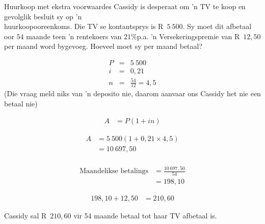\begin{wex}{Huurkoop met ekstra voorwaardes}{
    Cassidy is desperaat om 'n TV te koop en gevolglik besluit sy op 'n \\huurkoopooreenkoms. Die TV se kontantsprys is R~$5~500$. Sy moet dit afbetaal oor $54$ maande teen 'n rentekoers van $21\%$p.a. 'n Versekeringspremie van R~$12,50$ per maand word bygevoeg. Hoeveel moet sy per maand betaal?}{

    \begin{eqnarray*}
	P &=& 5~500\\
	i &=& 0,21\\
	n &=& \frac{54}{12} = 4,5
    \end{eqnarray*}
(Die vraag meld niks van 'n deposito nie, daarom aanvaar ons Cassidy het nie een betaal nie)

    \begin{align*}
	    A &= P(1 + in)
    \end{align*}

    \begin{align*}
	A &= 5~500(1 + 0,21 \times 4,5)\\
	  &= 10~697,50\\
    \end{align*}

    \begin{align*}
	\mbox{Maandelikse betalings} &= \frac{10~697,50}{54}\\
			&= 198,10
    \end{align*}

    \begin{align*}
	198,10 + 12,50 &= 210,60
    \end{align*}

    Cassidy sal R~$210,60$ vir 54 maande betaal tot haar TV afbetaal is.
}
\end{wex}


